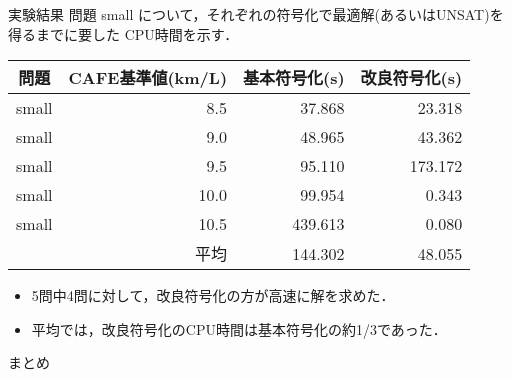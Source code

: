 \documentclass[dvipdfmx, 11pt]{beamer}
\begin{document}
\begin{frame}{実験結果}
 問題 small について，それぞれの符号化で最適解(あるいはUNSAT)を
 得るまでに要した CPU時間を示す．
 \begin{exampleblock}{} \centering 
  \begin{tabular}{crrr}
   問題		& CAFE基準値(km/L)  & 基本符号化(s)   & 改良符号化(s)    \\\hline
   small 	& 8.5              & 37.868         & \alert{23.318}  \\
   small	& 9.0              & 48.965         & \alert{43.362}  \\
   small	& 9.5              & \alert{95.110} & 173.172         \\
   small	& 10.0             & 99.954         & \alert{0.343}   \\
   small	& 10.5             & 439.613        & \alert{0.080}   \\\hline
   \multicolumn{2}{r}{平均}         & 144.302        & \alert{48.055}
  \end{tabular}
 \end{exampleblock}
 \begin{itemize}
  \item 5問中4問に対して，改良符号化の方が高速に解を求めた．
  \item 平均では，改良符号化のCPU時間は基本符号化の約1/3であった．
 \end{itemize}
\end{frame}
\begin{frame}{まとめ}

\end{frame}
\end{document}
